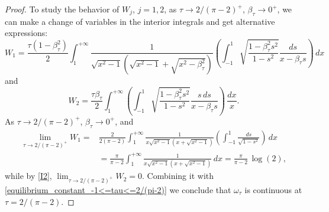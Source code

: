 \documentclass[reqno,11pt]{amsart}
\theoremstyle{plain}
\theoremstyle{definition}
\theoremstyle{remark}
\numberwithin{equation}{section}
\begin{document}
\begin{proof}
To study the behavior of $W_j$, $j=1,2$, as $\tau\to 2/(\pi-2)^+$, $\beta_\tau\to 0^+$, we can make a change of variables in the interior integrals and get alternative expressions: 
\begin{equation} \label{I1}
W_1   = \frac{\tau(1-\beta_\tau^2)}{2}\int_1^{+\infty} \frac{1}{\sqrt{ x^2-1} \left( \sqrt{ x^2-1}+\sqrt{ x^2-\beta_\tau^2}\right) } \left( \int_{-1}^{1}\sqrt{\frac{1-\beta_\tau^2 s^2}{1-s^2}}\frac{ds}{x-\beta_\tau s} \right) \,dx
\end{equation}
and
\begin{equation} \label{I2}
W_2   = \frac{\tau \beta_\tau }{2}\int_1^{+\infty}   \left( \int_{-1}^{1}\sqrt{\frac{1-\beta_\tau^2s^2}{1-s^2}}\frac{s\, ds}{x-\beta_\tau s} \right) \,\frac{dx}{x}.
\end{equation}
As $\tau\to 2/(\pi-2)^+$, $\beta_\tau\to 0^+$, and
\begin{align*}
\lim_{\tau\to 2/(\pi-2)^+} W_1  = & \frac{2 }{2(\pi-2)}\int_1^{+\infty} \frac{1}{x \sqrt{ x^2-1} \left(x+ \sqrt{ x^2-1}\right) } \left( \int_{-1}^{1}\frac{ds}{\sqrt{1-s^2}}   \right) \,dx \\
&= \frac{\pi}{\pi-2}\int_1^{+\infty} \frac{1}{x \sqrt{ x^2-1} \left(x+ \sqrt{ x^2-1}\right) }  \,dx  = \frac{\pi}{\pi-2}\, \log(2),
\end{align*}
while by \eqref{I2}, $\lim_{\tau\to 2/(\pi-2)^+} W_2= 0$. Combining it with \eqref{equilibrium_constant_-1<=tau<=2/(pi-2)} we conclude that $\omega_\tau$ is continuous at $\tau=2/(\pi-2)$.


\end{proof}
\end{document}
